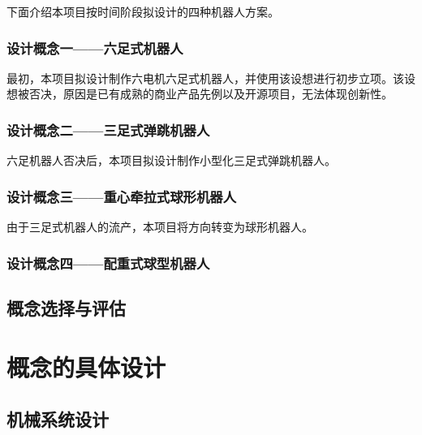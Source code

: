 \documentclass[a4paper]{ctexart}
\numberwithin{equation}{section}
\numberwithin{table}{section}
\numberwithin{figure}{section}
\begin{document}
下面介绍本项目按时间阶段拟设计的四种机器人方案。

\subsubsection{设计概念一——六足式机器人}

最初，本项目拟设计制作六电机六足式机器人，并使用该设想进行初步立项。该设想被否决，原因是已有成熟的商业产品先例以及开源项目，无法体现创新性。


\subsubsection{设计概念二——三足式弹跳机器人}

六足机器人否决后，本项目拟设计制作小型化三足式弹跳机器人。


\subsubsection{设计概念三——重心牵拉式球形机器人}

由于三足式机器人的流产，本项目将方向转变为球形机器人。

\subsubsection{设计概念四——配重式球型机器人}



\subsection{概念选择与评估}


\section{概念的具体设计}

\subsection{机械系统设计}
\end{document}
